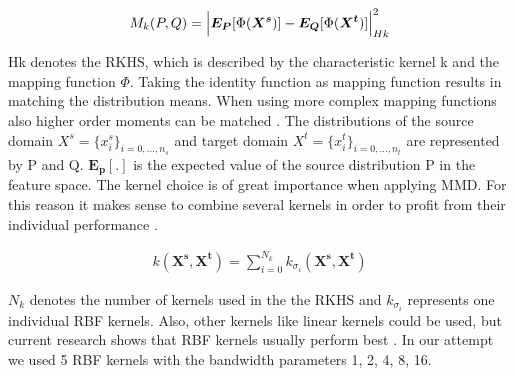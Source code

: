 \begin{align}
    M_{k}(P,Q) = \Bigl|  \boldsymbol{E_{P}}[\Phi(\boldsymbol{X^{s}})] - \boldsymbol{E_{Q}}[\Phi(\boldsymbol{X^{t}})]     \Bigl|^{2}_{Hk}
\end{align}

Hk denotes the RKHS, which is described by the characteristic kernel k and the mapping function $\Phi$. Taking the identity function as mapping function results in matching the distribution means. When using more complex mapping functions also higher order moments can be matched \cite{Yujia2015}. The distributions of the source domain $X^{s} = \{{x}_{i}^{s}\}_{i=0,...,n_{s}}$ and target domain $X^{t} = \{{x}_{i}^{t}\}_{i=0,...,n_{t}}$ are represented by P and Q. $\boldsymbol{E_{p}[.]}$ is the expected value of the source distribution P in the feature space. The kernel choice is of great importance when applying MMD. For this reason it makes sense to combine several kernels in order to profit from their individual performance \cite{li2020domain}.

\begin{align}
    k(\boldsymbol{X^{s}}, \boldsymbol{X^{t}}) = \sum_{i=0}^{N_{k}} k_{\sigma_{i}}(\boldsymbol{X^{s}}, \boldsymbol{X^{t}})
\end{align}

$N_{k}$ denotes the number of kernels used in the the RKHS and $k_{\sigma_{i}}$ represents one individual RBF kernels. Also, other kernels like linear kernels could be used, but current research shows that RBF kernels usually perform best \cite{AZAMFAR2020103932}. In our attempt we used 5 RBF kernels with the bandwidth parameters 1, 2, 4, 8, 16.


